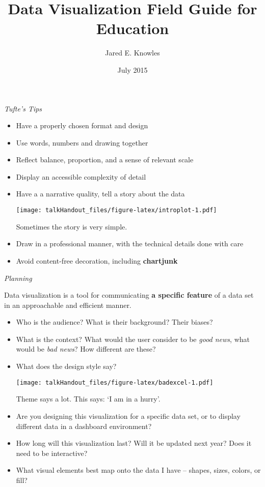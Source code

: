 \documentclass{tufte-handout}
\title{Data Visualization Field Guide for Education}
\author{Jared E. Knowles}
\date{July 2015}
\begin{document}
\maketitle


\vspace{5mm}
\noindent \emph{Tufte's Tips}

\begin{itemize}
\itemsep1pt\parskip0pt
\item
  Have a properly chosen format and design
\item
  Use words, numbers and drawing together
\item
  Reflect balance, proportion, and a sense of relevant scale
\item
  Display an accessible complexity of detail
\item
  Have a a narrative quality, tell a story about the data

  \begin{marginfigure}
   \texttt{[image: talkHandout\_files/figure-latex/introplot-1.pdf]}
  \caption{Sometimes the story is very simple.}
  \end{marginfigure}
\item
  Draw in a professional manner, with the technical details done with
  care
\item
  Avoid content-free decoration, including \textbf{chartjunk}
\end{itemize}

\vspace{2.5mm}
\noindent \emph{Planning}

\noindent Data visualization is a tool for communicating \textbf{a
specific feature} of a data set in an approachable and efficient
manner.

\begin{itemize}
\itemsep1pt\parskip0pt
\item
  Who is the audience? What is their background? Their biases?
\item
  What is the context? What would the user consider to be \emph{good
  news}, what would be \emph{bad news}? How different are these?
\item
  What does the design style say?

  \begin{marginfigure}
   \texttt{[image: talkHandout\_files/figure-latex/badexcel-1.pdf]}
  \caption{Theme says a lot. This says: `I am in a hurry'.}
  \end{marginfigure}
\item
  Are you designing this visualization for a specific data set, or to
  display different data in a dashboard environment?
\item
  How long will this visualization last? Will it be updated next year?
  Does it need to be interactive?
\item
  What visual elements best map onto the data I have -- shapes, sizes,
  colors, or fill?
\end{itemize}
\end{document}
